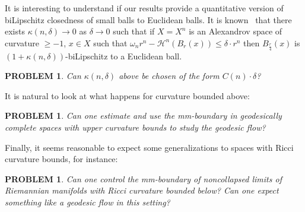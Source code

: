 \documentclass[12pt,leqno,intlimits]{amsart}
\numberwithin{equation}{section}
\newtheorem{quest}[thm]{PROBLEM}
\theoremstyle{definition}
\theoremstyle{remark}
\begin{document}
It is interesting to understand if our results provide a quantitative version of biLipschitz closedness of small balls to Euclidean balls. It is known~\cite{BGP} that there exists $\kappa(n,\delta)\to 0$ as $\delta\to 0$ such that if  $X=X^n$  is an Alexandrov space of curvature $\ge -1$, $x\in X$  such that  $\omega _n r^n -\mathcal H^n (B_r (x)) \leq \delta  \cdot r ^n$ then $B_{\frac r 4} (x)$ is  $(1+\kappa(n,\delta))$-biLipschitz  to a Euclidean ball.
\begin{quest}
Can  $\kappa(n,\delta)$ above be chosen 
 of the form $C(n)\cdot \delta$? 
\end{quest}





 It is natural to look at what happens for  curvature bounded above:


\begin{quest}  \label{qe:CAT}
Can one estimate and use the mm-boundary in geodesically complete spaces with upper curvature bounds to study the geodesic flow?
\end{quest}

Finally, it seems reasonable to expect some generalizations to spaces with Ricci curvature bounds, for instance:


\begin{quest}
Can one control the mm-boundary of noncollapsed limits of Riemannian manifolds with Ricci curvature bounded below? Can one expect something like a geodesic flow in this setting?
\end{quest}
\end{document}

